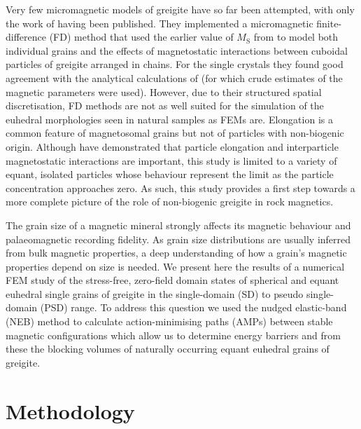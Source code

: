 Very few micromagnetic models of greigite have so far been attempted, with only the work of \citet{Muxworthy2013} having been published. They implemented a micromagnetic finite-difference (FD) method that used the earlier value of $M_\text{S}$ from \citet{Chang2009} to model both individual grains and the effects of magnetostatic interactions between cuboidal particles of greigite arranged in chains. For the single crystals they found good agreement with the analytical calculations of \citet{Diaz-Ricci1992} (for which crude estimates of the magnetic parameters were used). However, due to their structured spatial discretisation, FD methods are not as well suited for the simulation of the euhedral morphologies seen in natural samples \citep{Snowball1997} as FEMs are. Elongation is a common feature of magnetosomal grains but not of particles with non-biogenic origin. Although \citet{Muxworthy2013} have demonstrated that particle elongation and interparticle magnetostatic interactions are important, this study is limited to a variety of equant, isolated particles whose behaviour represent the limit as the particle concentration approaches zero. As such, this study provides a first step towards a more complete picture of the role of non-biogenic greigite in rock magnetics.\par

The grain size of a magnetic mineral strongly affects its magnetic behaviour and palaeomagnetic recording fidelity. As grain size distributions are usually inferred from bulk magnetic properties, a deep understanding of how a grain's magnetic properties depend on size is needed. We present here the results of a numerical FEM study of the stress-free, zero-field domain states of spherical and equant euhedral single grains of greigite in the single-domain (SD) to pseudo single-domain (PSD) range. To address this question we used the nudged elastic-band (NEB) method \citep{Fabian2017} to calculate action-minimising paths (AMPs) between stable magnetic configurations which allow us to determine energy barriers and from these the blocking volumes of naturally occurring equant euhedral grains of greigite.\par

\section{Methodology}
